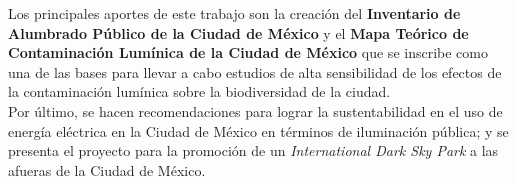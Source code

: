 Los principales aportes de este trabajo son la creación del \textbf{Inventario de Alumbrado Público de la Ciudad de México} y el \textbf{Mapa Teórico de Contaminación Lumínica de la Ciudad de México} que se inscribe como una de las bases para llevar a cabo estudios de alta sensibilidad de los efectos de la contaminación lumínica sobre la biodiversidad de la ciudad.\\

Por último, se hacen recomendaciones para lograr la sustentabilidad en el uso de energía eléctrica en la Ciudad de México en términos de iluminación pública; y se presenta el proyecto para la promoción de un \textit{International Dark Sky Park} a las afueras de la Ciudad de México. \\

